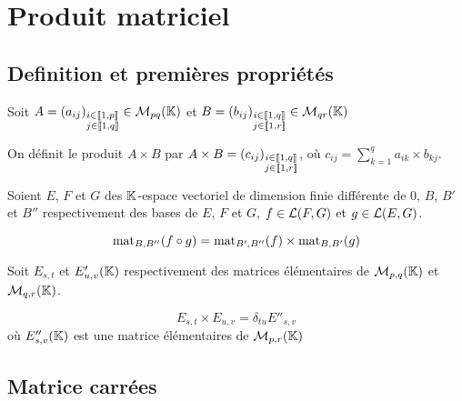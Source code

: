 \section{Produit matriciel}


\subsection{Definition et premières propriétés}

\begin{dfn}
Soit $A = (a_{ij})_ {
    \substack {i \in \llbracket 1, p \rrbracket \\ j \in \llbracket 1, q \rrbracket}}
    \in \operatorname{\mathcal{M}}_{pq}(\mathbb{K})$
et $B = (b_{ij})_ {
    \substack {i \in \llbracket 1, q \rrbracket \\ j \in \llbracket 1, r \rrbracket}}
    \in \operatorname{\mathcal{M}}_{qr}(\mathbb{K})$

On définit le produit $A \times B$ par $A \times B = (c_{ij})_{
    \substack { i \in \llbracket 1, q \rrbracket \\ j \in \llbracket 1, r \rrbracket}}$,
où $c_{ij} = \sum_{k = 1}^q a_{ik} \times b_{kj}$.
\end{dfn}

\begin{prp}
Soient $E$, $F$ et $G$ des $\mathbb{K}$-espace vectoriel de dimension finie
différente de $0$, $B$, $B'$ et $B''$ respectivement des bases de
$E$, $F$ et $G$, $f \in \operatorname{\mathcal{L}}(F, G)$ et $g \in \operatorname{\mathcal{L}}(E, G)$.

\[
    \operatorname{mat}_{B, B''}(f \circ g) = \operatorname{mat}_{B', B''}(f) \times 
    \operatorname{mat}_{B, B'}(g)
\]
\end{prp}

\begin{prp}
Soit $E_{s, t}$ et $E'_{u, v}(\mathbb{K})$ respectivement des matrices élémentaires
de $\operatorname{\mathcal{M}}_{p, q}(\mathbb{K})$ et $\operatorname{\mathcal{M}}_{q, r}(\mathbb{K})$.

\[
    E_{s, t} \times E_{u, v} = \delta_{tu} E''_{s, v}
\]
où $E''_{s, v}(\mathbb{K})$ est une matrice élémentaires de $\operatorname{\mathcal{M}}_{p, r}(\mathbb{K})$
\end{prp}


\subsection{Matrice carrées}

